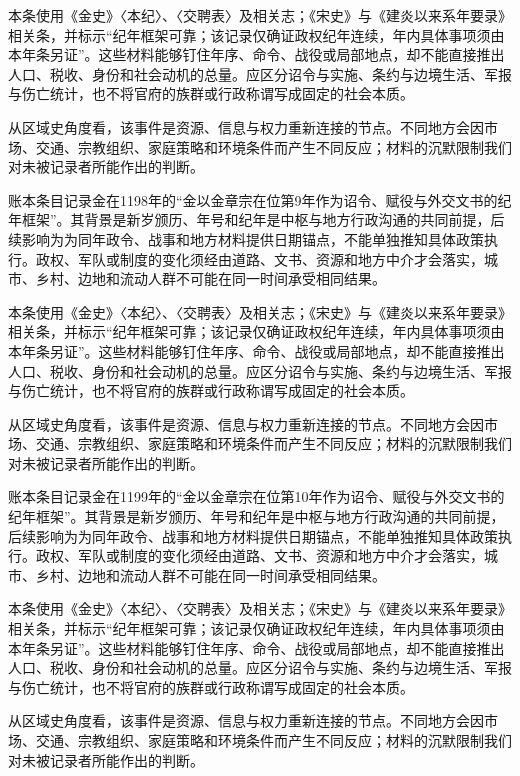 本条使用《金史》〈本纪〉、〈交聘表〉及相关志；《宋史》与《建炎以来系年要录》相关条，并标示“纪年框架可靠；该记录仅确证政权纪年连续，年内具体事项须由本年条另证”。这些材料能够钉住年序、命令、战役或局部地点，却不能直接推出人口、税收、身份和社会动机的总量。应区分诏令与实施、条约与边境生活、军报与伤亡统计，也不将官府的族群或行政称谓写成固定的社会本质。

从区域史角度看，该事件是资源、信息与权力重新连接的节点。不同地方会因市场、交通、宗教组织、家庭策略和环境条件而产生不同反应；材料的沉默限制我们对未被记录者所能作出的判断。

账本条目记录金在1198年的“金以金章宗在位第9年作为诏令、赋役与外交文书的纪年框架”。其背景是新岁颁历、年号和纪年是中枢与地方行政沟通的共同前提，后续影响为为同年政令、战事和地方材料提供日期锚点，不能单独推知具体政策执行。政权、军队或制度的变化须经由道路、文书、资源和地方中介才会落实，城市、乡村、边地和流动人群不可能在同一时间承受相同结果。

本条使用《金史》〈本纪〉、〈交聘表〉及相关志；《宋史》与《建炎以来系年要录》相关条，并标示“纪年框架可靠；该记录仅确证政权纪年连续，年内具体事项须由本年条另证”。这些材料能够钉住年序、命令、战役或局部地点，却不能直接推出人口、税收、身份和社会动机的总量。应区分诏令与实施、条约与边境生活、军报与伤亡统计，也不将官府的族群或行政称谓写成固定的社会本质。

从区域史角度看，该事件是资源、信息与权力重新连接的节点。不同地方会因市场、交通、宗教组织、家庭策略和环境条件而产生不同反应；材料的沉默限制我们对未被记录者所能作出的判断。

账本条目记录金在1199年的“金以金章宗在位第10年作为诏令、赋役与外交文书的纪年框架”。其背景是新岁颁历、年号和纪年是中枢与地方行政沟通的共同前提，后续影响为为同年政令、战事和地方材料提供日期锚点，不能单独推知具体政策执行。政权、军队或制度的变化须经由道路、文书、资源和地方中介才会落实，城市、乡村、边地和流动人群不可能在同一时间承受相同结果。

本条使用《金史》〈本纪〉、〈交聘表〉及相关志；《宋史》与《建炎以来系年要录》相关条，并标示“纪年框架可靠；该记录仅确证政权纪年连续，年内具体事项须由本年条另证”。这些材料能够钉住年序、命令、战役或局部地点，却不能直接推出人口、税收、身份和社会动机的总量。应区分诏令与实施、条约与边境生活、军报与伤亡统计，也不将官府的族群或行政称谓写成固定的社会本质。

从区域史角度看，该事件是资源、信息与权力重新连接的节点。不同地方会因市场、交通、宗教组织、家庭策略和环境条件而产生不同反应；材料的沉默限制我们对未被记录者所能作出的判断。

